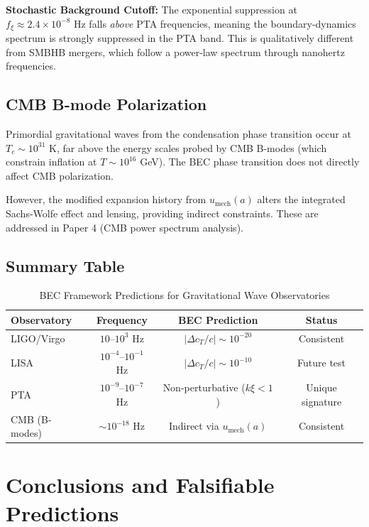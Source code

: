 \documentclass[11pt,a4paper]{article}
\newcommand{\cT}{\ensuremath{c_T}}
\newcommand{\umech}{\ensuremath{u_{\mathrm{mech}}}}
\theoremstyle{definition}
\theoremstyle{remark}
\begin{document}
\textbf{Stochastic Background Cutoff:} The exponential suppression at $f_\xi \approx 2.4 \times 10^{-8}$ Hz falls \emph{above} PTA frequencies, meaning the boundary-dynamics spectrum is strongly suppressed in the PTA band. This is qualitatively different from SMBHB mergers, which follow a power-law spectrum through nanohertz frequencies.

\subsection{CMB B-mode Polarization}
\label{sec:cmb_bmodes}

Primordial gravitational waves from the condensation phase transition occur at $T_c \sim 10^{31}$ K, far above the energy scales probed by CMB B-modes (which constrain inflation at $T \sim 10^{16}$ GeV). The BEC phase transition does not directly affect CMB polarization.

However, the modified expansion history from $\umech(a)$ alters the integrated Sachs-Wolfe effect and lensing, providing indirect constraints. These are addressed in Paper 4 (CMB power spectrum analysis).

\subsection{Summary Table}
\label{sec:summary_table}

\begin{table}[H]
\centering
\caption{BEC Framework Predictions for Gravitational Wave Observatories}
\label{tab:predictions}
\begin{tabular}{@{}lccc@{}}
\toprule
\textbf{Observatory} & \textbf{Frequency} & \textbf{BEC Prediction} & \textbf{Status} \\
\midrule
LIGO/Virgo & $10$--$10^3$ Hz & $|\Delta\cT/c| \sim 10^{-20}$ & Consistent \\
LISA & $10^{-4}$--$10^{-1}$ Hz & $|\Delta\cT/c| \sim 10^{-10}$ & Future test \\
PTA & $10^{-9}$--$10^{-7}$ Hz & Non-perturbative ($k\xi < 1$) & Unique signature \\
CMB (B-modes) & $\sim 10^{-18}$ Hz & Indirect via $\umech(a)$ & Consistent \\
\bottomrule
\end{tabular}
\end{table}

\section{Conclusions and Falsifiable Predictions}
\label{sec:conclusions}
\end{document}
